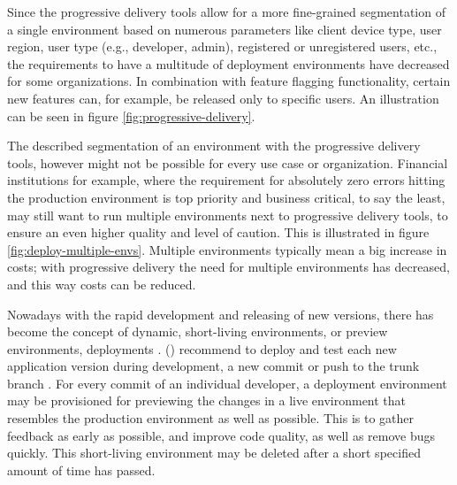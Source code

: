 Since the progressive delivery tools allow for a more
fine-grained segmentation
of a single environment based on numerous parameters like
client device type, user region, user type (e.g., developer, admin),
registered or unregistered users, etc.,
the requirements to have a multitude of deployment environments
have decreased for some organizations.
In combination with feature flagging functionality,
certain new features can, for example, be released only to specific users.
An illustration can be seen in figure \ref{fig:progressive-delivery}.


The described segmentation of an environment with the progressive delivery
tools, however might not be possible for every use case or organization.
Financial institutions for example, where the requirement for absolutely zero
errors hitting the production environment is top priority and business critical,
to say the least,
may still want to run multiple environments next to progressive delivery tools,
to ensure an even higher quality and level of caution.
This is illustrated in figure \ref{fig:deploy-multiple-envs}.
Multiple environments typically mean a big increase in costs;
with progressive delivery the need for multiple environments has decreased,
and this way costs can be reduced.



Nowadays with the rapid development and releasing of new versions,
there has become the concept of dynamic, short-living environments,
or preview environments, deployments
\autocite{gitopsCloudnativeCDInnoq}.
\citeauthor{hightower2017kubernetes} (\citeyear{hightower2017kubernetes})
recommend to deploy and test each new application version during development,
a new commit or push to the trunk branch
\autocite{hightower2017kubernetes}.
%
For every commit of an individual developer,
a deployment environment may be provisioned for previewing the changes
in a live environment that resembles the production environment as well as possible.
This is to gather feedback as early as possible,
and improve code quality, as well as remove bugs quickly.
This short-living environment may be deleted after a short specified
amount of time has passed.







